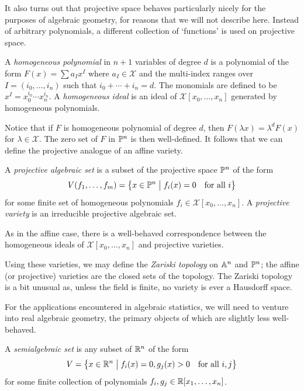 \documentclass[cclicense]{hmcthesis}
\newcommand*{\F}{\mathcal{X}}
\newcommand*{\vbar}{\;\big\vert\;}
\numberwithin{equation}{section}
\begin{document}
    It also turns out that projective space behaves particularly nicely for the
    purposes of algebraic geometry, for reasons that we will not describe here.
    Instead of arbitrary polynomials, a different collection of `functions' is
    used on projective space.
    \begin{definition}
        A \emph{homogeneous polynomial} in $n+1$ variables of degree $d$ is a
        polynomial of the form $F(x) = \sum a_I x^I$ where $a_I \in \F$ and the
        multi-index ranges over $I = (i_0, \ldots, i_n)$ such that $i_0 + \cdots
        + i_n = d$.  The monomials are defined to be $x^I = x_0^{i_0}\cdots
        x_n^{i_n}$.  A \emph{homogeneous ideal} is an ideal of $\F[x_0, \ldots,
        x_n]$ generated by homogeneous polynomials.
    \end{definition}
    Notice that if $F$ is homogeneous polynomial of degree $d$, then $F(\lambda
    x) = \lambda^d F(x)$ for $\lambda \in \F$.  The zero set of $F$ in $\mathbb{P}^n$
    is then well-defined.  It follows that we can define the projective analogue
    of an affine variety.
    \begin{definition}
        A \emph{projective algebraic set} is a subset of the projective space
        $\mathbb{P}^n$ of the form
        \[
            V(f_1, \ldots, f_m)
            = \cdel[\big]{x \in \Proj^n \vbar f_i(x) = 0 \quad\text{for all $i$}}
        \]
        for some finite set of homogeneous polynomials $f_i \in \F[x_0,
        \ldots,x_n]$.  A \emph{projective variety} is an irreducible projective
        algebraic set.
    \end{definition}
    As in the affine case, there is a well-behaved correspondence between the
    homogeneous ideals of $\F[x_0, \ldots, x_n]$ and projective varieties.

    Using these varieties, we may define the \emph{Zariski topology} on $\mathbb{A}^n$
    and $\mathbb{P}^n$;  the affine (or projective) varieties are the closed sets of
    the topology.  The Zariski topology is a bit unusual as, unless the field is
    finite, no variety is ever a Hausdorff space.

    For the applications encountered in algebraic statistics, we will need to
    venture into real algebraic geometry, the primary objects of which are
    slightly less well-behaved.
    \begin{definition}
        A \emph{semialgebraic set} is any subset of $\mathbb{R}^n$ of the form
        \[
            V = \cdel[\big]{ x \in \R^n \vbar
                f_i(x) = 0, g_j(x) > 0
            \quad\text{for all $i,j$}}
        \]
        for some finite collection of polynomials $f_i, g_j \in \mathbb{R}[x_1, \ldots,
        x_n]$.
    \end{definition}
\end{document}
